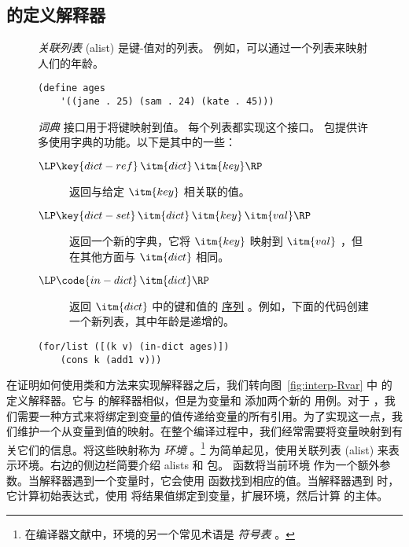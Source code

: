 \documentclass[11pt]{book}
\begin{document}
\newpage

\subsection{\LangVar{} 的定义解释器}

\begin{wrapfigure}[21]{r}[1.0in]{0.6\textwidth}
  \small
  \begin{tcolorbox}[title=作为字典的关联列表]
  \emph{关联列表} (alist) 是键-值对的列表。
  例如，可以通过一个列表来映射人们的年龄。
  \begin{lstlisting}[basicstyle=\ttfamily\footnotesize]
  (define ages
    '((jane . 25) (sam . 24) (kate . 45)))
  \end{lstlisting}
  \emph{词典} 接口用于将键映射到值。
  每个列表都实现这个接口。 
  \href{https://docs.racket-lang.org/reference/dicts.html}{}
  包提供许多使用字典的功能。以下是其中的一些：
  \begin{description}
  \item[$\LP\key{dict-ref}\,\itm{dict}\,\itm{key}\RP$]
    返回与给定 $\itm{key}$ 相关联的值。
  \item[$\LP\key{dict-set}\,\itm{dict}\,\itm{key}\,\itm{val}\RP$]
    返回一个新的字典，它将 $\itm{key}$ 映射到 $\itm{val}$
    ，但在其他方面与 $\itm{dict}$ 相同。
  \item[$\LP\code{in-dict}\,\itm{dict}\RP$] 返回  $\itm{dict}$ 中的键和值的
    \href{https://docs.racket-lang.org/reference/sequences.html}{序列}
    。例如，下面的代码创建一个新列表，其中年龄是递增的。
  \end{description}
  \vspace{-10pt}
  \begin{lstlisting}[basicstyle=\ttfamily\footnotesize]
  (for/list ([(k v) (in-dict ages)])
    (cons k (add1 v)))
  \end{lstlisting}
\end{tcolorbox}
\end{wrapfigure}

在证明如何使用类和方法来实现解释器之后，我们转向图~\ref{fig:interp-Rvar} 中 \LangVar{}
的定义解释器。它与
\LangInt{} 的解释器相似，但是为变量和  添加两个新的  用例。对于  ，我们需要一种方式来将绑定到变量的值传递给变量的所有引用。为了实现这一点，我们维护一个从变量到值的映射。在整个编译过程中，我们经常需要将变量映射到有关它们的信息。将这些映射称为
\emph{环境} 。\footnote{在编译器文献中，环境的另一个常见术语是 \emph{符号表} 。}
%
为简单起见，使用关联列表 (alist) 来表示环境。右边的侧边栏简要介绍
alists 和  包。
函数将当前环境  作为一个额外参数。当解释器遇到一个变量时，它会使用  函数找到相应的值。当解释器遇到  时，它计算初始表达式，使用  将结果值绑定到变量，扩展环境，然后计算
 的主体。
\end{document}
